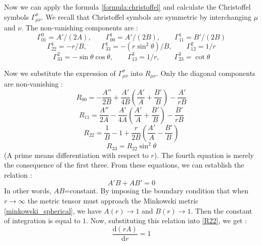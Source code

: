 Now we can apply the formula \eqref{formula:christoffel} and calculate the Christoffel
symbols $\Gamma^{\sigma}_{\mu\nu}$. We recall that Christoffel symbols are symmetric by
interchanging $\mu$ and $\nu$. The non-vanishing components are :
%
\begin{equation}\label{christoffel}
	\Gamma^{0}_{01}=A'/\left(2A\right),\qquad \Gamma^{1}_{00}=A'/\left(2B\right),
	\qquad \Gamma^{1}_{11}=B'/\left(2B\right)
\end{equation}
%
\begin{equation}
	\Gamma^{1}_{22}=-r/B,\qquad \Gamma^{1}_{33}=-\left(r\sin^2\theta\right) /B,
	\qquad \Gamma^{2}_{12}=1/r
\end{equation}
%
\begin{equation}
	\Gamma^{2}_{33}=-\sin\theta \cos\theta ,\qquad \Gamma^{3}_{13}=1/r,
	\qquad \Gamma^{3}_{23}=\cot\theta
\end{equation}

Now we substitute the expression of $\Gamma^{\sigma}_{\mu\nu}$ into $R_{\mu\nu}$. Only the diagonal
components are non-vanishing :
%
\begin{equation}
	R_{00}=-\frac{A''}{2B}+\frac{A'}{4B}\left(\frac{A'}{A}+\frac{B'}{B}\right)-\frac{A'}{rB}
\end{equation}
%
\begin{equation}
	R_{11}=\frac{A''}{2A}-\frac{A'}{4A}\left(\frac{A'}{A}+\frac{B'}{B}\right)-\frac{B'}{rB}
\end{equation}
%
\begin{equation}\label{R22}
	R_{22}=\frac{1}{B}-1+\frac{r}{2B}\left(\frac{A'}{A}-\frac{B'}{B}\right)
\end{equation}
%
\begin{equation}
	R_{33}=R_{22}\sin^2\theta
\end{equation}
%
(A prime means differentiation with respect to $r$).
The fourth equation is merely the consequence of the first three. From these equations, we can establish the relation :
%
\begin{equation}
	A'B+AB'=0
\end{equation}
%
In other words, $AB$=constant. By imposing the boundary condition that when $r\rightarrow \infty$ the metric tensor must approach
the Minkowski metric \eqref{minkowski_spherical}, we have $A(r)\rightarrow 1$ and $B(r) \rightarrow 1$. Then the constant of integration is equal to $1$.
Now, substituting this relation into \eqref{R22}, we get :
%
\begin{equation}
	\frac{\mathrm{d}\left(rA\right)}{\mathrm{d}r}= 1
\end{equation}

